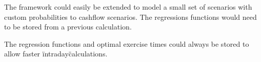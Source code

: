 \documentclass[a4paper,10pt]{article}
\begin{document}
The framework could easily be extended to model a small set of scenarios with custom probabilities to cashflow scenarios.  The regressions functions would need to be stored from a previous calculation.

The regression functions and optimal exercise times could always be stored to allow faster \"intraday\" calculations.




\end{document}
